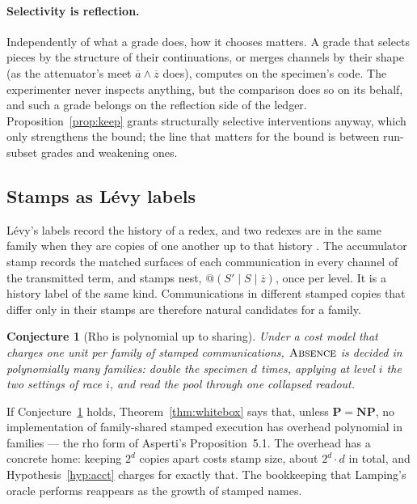 \documentclass[11pt]{article}
\makeatletter
\theoremstyle{definition}
\theoremstyle{plain}
\newtheorem{conjecture}[definition]{Conjecture}
\theoremstyle{remark}
\newcommand{\quo}[1]{@#1}
\newcommand{\dr}[1]{\overline{#1}}
\newcommand{\ABS}{\textup{\textsc{Absence}}}
\newcommand{\Pclass}{\mathbf{P}}
\newcommand{\NPclass}{\mathbf{NP}}
\makeatother
\begin{document}
\paragraph{Selectivity is reflection.} Independently of what a grade does,
how it chooses matters. A grade that selects pieces by the structure of
their continuations, or merges channels by their shape (as the
attenuator's meet $\dr a \wedge \dr z$ does), computes on the specimen's
code. The experimenter never inspects anything, but the comparison does
so on its behalf, and such a grade belongs on the reflection side of the
ledger. Proposition~\ref{prop:keep} grants structurally selective
interventions anyway, which only strengthens the bound; the line that
matters for the bound is between run-subset grades and weakening ones.

\subsection{Stamps as Lévy labels}\label{sec:levy}

Lévy's labels record the history of a redex, and two redexes are in the
same family when they are copies of one another up to that history
\cite{Levy78}. The accumulator stamp records the matched surfaces of each
communication in every channel of the transmitted term, and stamps nest,
$\quo{(S' \mid S \mid \dr z)}$, once per level. It is a history label of
the same kind. Communications in different stamped copies that differ
only in their stamps are therefore natural candidates for a family.

\begin{conjecture}[Rho is polynomial up to sharing]\label{conj:upto}
Under a cost model that charges one unit per family of stamped
communications, $\ABS$ is decided in polynomially many families: double
the specimen $d$ times, applying at level $i$ the two settings of race
$i$, and read the pool through one collapsed readout.
\end{conjecture}

\noindent
If Conjecture~\ref{conj:upto} holds, Theorem~\ref{thm:whitebox} says
that, unless $\Pclass = \NPclass$, no implementation of family-shared
stamped execution has overhead polynomial in families --- the rho form of
Asperti's Proposition~5.1. The overhead has a concrete home: keeping
$2^d$ copies apart costs stamp size, about $2^d \cdot d$ in total, and
Hypothesis~\ref{hyp:acct} charges for exactly that. The bookkeeping that
Lamping's oracle performs reappears as the growth of stamped names.
\end{document}
